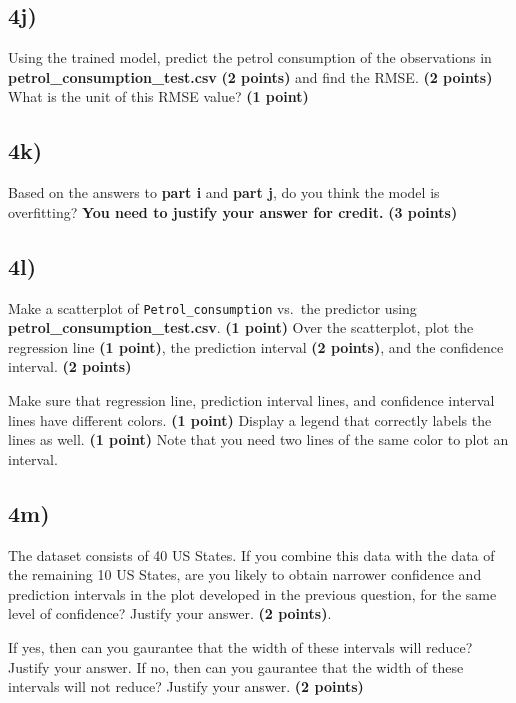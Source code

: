 \documentclass[
  letterpaper,
  DIV=11,
  numbers=noendperiod]{scrreprt}
\begin{document}
\subsection{4j)}\label{j}

Using the trained model, predict the petrol consumption of the
observations in \textbf{petrol\_consumption\_test.csv} \textbf{(2
points)} and find the RMSE. \textbf{(2 points)} What is the unit of this
RMSE value? \textbf{(1 point)}

\subsection{4k)}\label{k}

Based on the answers to \textbf{part i} and \textbf{part j}, do you
think the model is overfitting? \textbf{You need to justify your answer
for credit.} \textbf{(3 points)}

\subsection{4l)}\label{l}

Make a scatterplot of \texttt{Petrol\_consumption} vs.~the predictor
using \textbf{petrol\_consumption\_test.csv}. \textbf{(1 point)} Over
the scatterplot, plot the regression line \textbf{(1 point)}, the
prediction interval \textbf{(2 points)}, and the confidence interval.
\textbf{(2 points)}

Make sure that regression line, prediction interval lines, and
confidence interval lines have different colors. \textbf{(1 point)}
Display a legend that correctly labels the lines as well. \textbf{(1
point)} Note that you need two lines of the same color to plot an
interval.

\subsection{4m)}\label{m}

The dataset consists of 40 US States. If you combine this data with the
data of the remaining 10 US States, are you likely to obtain narrower
confidence and prediction intervals in the plot developed in the
previous question, for the same level of confidence? Justify your
answer. \textbf{(2 points)}.

If yes, then can you gaurantee that the width of these intervals will
reduce? Justify your answer. If no, then can you gaurantee that the
width of these intervals will not reduce? Justify your answer.
\textbf{(2 points)}
\end{document}

